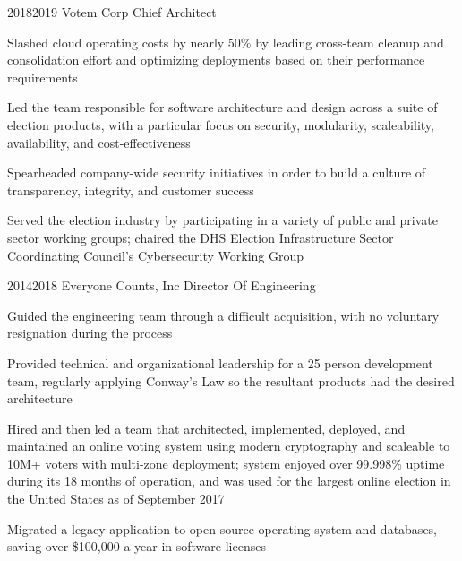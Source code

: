 \documentclass[9pt]{article}
\begin{document}
\job
  {2018}{2019}
  {Votem Corp}
  {Chief Architect}
  {\begin{achievements}
    \item Slashed cloud operating costs by nearly 50\% by leading cross-team cleanup and consolidation effort and optimizing deployments based on their performance requirements
    \item Led the team responsible for software architecture and design across a suite of election products, with a particular focus on security, modularity, scaleability, availability, and cost-effectiveness
    \item Spearheaded company-wide security initiatives in order to build a culture of transparency, integrity, and customer success
    \item Served the election industry by participating in a variety of public and private sector working groups; chaired the DHS Election Infrastructure Sector Coordinating Council's Cybersecurity Working Group
  \end{achievements}}

\pagebreak

\job
  {2014}{2018}
  {Everyone Counts, Inc}
  {Director Of Engineering}
  {\begin{achievements}
    \item Guided the engineering team through a difficult acquisition, with no voluntary resignation during the process
    \item Provided technical and organizational leadership for a 25 person development team, regularly applying Conway's Law so the resultant products had the desired architecture
    \item Hired and then led a team that architected, implemented, deployed, and maintained an online voting system using modern cryptography and scaleable to 10M+ voters with multi-zone deployment; system enjoyed over 99.998\% uptime during its 18 months of operation, and was used for the largest online election in the United States as of September 2017
    \item Migrated a legacy application to open-source operating system and databases, saving over \$100,000 a year in software licenses
  \end{achievements}}
\end{document}
